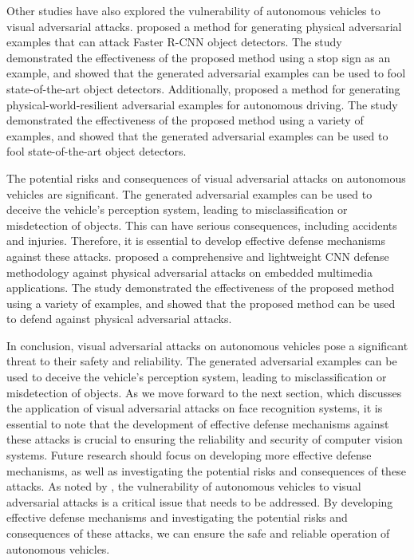 \documentclass[11pt,a4paper]{article}
\begin{document}
Other studies have also explored the vulnerability of autonomous vehicles to visual adversarial attacks. \cite{doi:10.1007/978-3-030-10925-7_4} proposed a method for generating physical adversarial examples that can attack Faster R-CNN object detectors. The study demonstrated the effectiveness of the proposed method using a stop sign as an example, and showed that the generated adversarial examples can be used to fool state-of-the-art object detectors. Additionally, \cite{doi:10.1109/cvpr42600.2020.01426} proposed a method for generating physical-world-resilient adversarial examples for autonomous driving. The study demonstrated the effectiveness of the proposed method using a variety of examples, and showed that the generated adversarial examples can be used to fool state-of-the-art object detectors.

The potential risks and consequences of visual adversarial attacks on autonomous vehicles are significant. The generated adversarial examples can be used to deceive the vehicle's perception system, leading to misclassification or misdetection of objects. This can have serious consequences, including accidents and injuries. Therefore, it is essential to develop effective defense mechanisms against these attacks. \cite{doi:10.1109/asp-dac47756.2020.9045584} proposed a comprehensive and lightweight CNN defense methodology against physical adversarial attacks on embedded multimedia applications. The study demonstrated the effectiveness of the proposed method using a variety of examples, and showed that the proposed method can be used to defend against physical adversarial attacks.

In conclusion, visual adversarial attacks on autonomous vehicles pose a significant threat to their safety and reliability. The generated adversarial examples can be used to deceive the vehicle's perception system, leading to misclassification or misdetection of objects. As we move forward to the next section, which discusses the application of visual adversarial attacks on face recognition systems, it is essential to note that the development of effective defense mechanisms against these attacks is crucial to ensuring the reliability and security of computer vision systems. Future research should focus on developing more effective defense mechanisms, as well as investigating the potential risks and consequences of these attacks. As noted by \cite{doi:10.1109/iros51168.2021.9636638}, the vulnerability of autonomous vehicles to visual adversarial attacks is a critical issue that needs to be addressed. By developing effective defense mechanisms and investigating the potential risks and consequences of these attacks, we can ensure the safe and reliable operation of autonomous vehicles.
\end{document}
